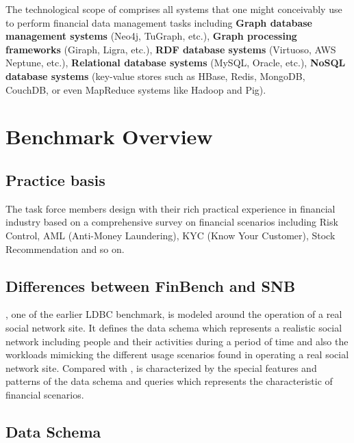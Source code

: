 The technological scope of \ldbcfinbench comprises all systems that one might
conceivably use to perform financial data management tasks including
\textbf{Graph database management systems} (\eg Neo4j, TuGraph, etc.), \textbf{
Graph processing frameworks} (\eg Giraph, Ligra, etc.), \textbf{RDF database
systems} (\eg Virtuoso, AWS Neptune, etc.), \textbf{Relational database systems}
(\eg MySQL, Oracle, etc.), \textbf{NoSQL database systems} (\eg key-value stores
such as HBase, Redis, MongoDB, CouchDB, or even MapReduce systems like Hadoop
and Pig).


\section{Benchmark Overview}

\subsection{Practice basis}

The task force members design \ldbcfinbench with their rich practical experience in
financial industry based on a comprehensive survey on financial scenarios including
Risk Control, AML (Anti-Money Laundering), KYC (Know Your Customer), Stock Recommendation
and so on.

\subsection{Differences between FinBench and SNB}

\ldbcsnb, one of the earlier LDBC benchmark, is modeled around the operation of a real social network site. It defines the data schema which represents a realistic social network including people and their activities during a period of time and also the workloads mimicking the different usage scenarios found in operating a real social network site. Compared with \ldbcsnb, \ldbcfinbench is characterized by the special features and patterns of the data schema and queries which represents the characteristic of financial scenarios.

\subsection{Data Schema}

